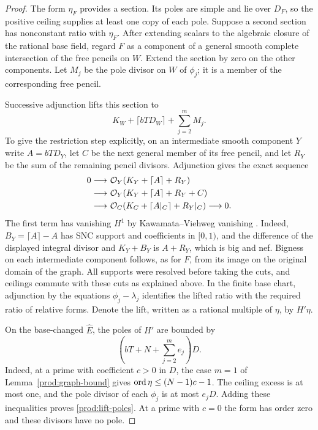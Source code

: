 \begin{proof}
The form $\eta_F$ provides a section.  Its poles are simple and lie
over $D_F$, so the positive ceiling supplies at least one copy of each
pole.  Suppose a second section has nonconstant ratio with $\eta_F$.
After extending scalars to the algebraic closure of the rational base
field, regard $F$ as a component of a general smooth complete
intersection of the free pencils on $W$.  Extend the section by zero
on the other components.  Let $M_j$ be the pole divisor on $W$ of
$\phi_j$; it is a member of the corresponding free pencil.

Successive adjunction lifts this section to
\[
 K_W+\lceil bTD_W\rceil+\sum_{j=2}^m M_j.
\]
To give the restriction step explicitly, on an intermediate smooth
component $Y$ write $A=bTD_Y$, let $C$ be the next general member of
its free pencil, and let $R_Y$ be the sum of the remaining pencil
divisors.  Adjunction gives the exact sequence
\[
\begin{split}
0\longrightarrow&\ \mathcal O_Y(K_Y+\lceil A\rceil+R_Y)\\
\longrightarrow&\ \mathcal O_Y(K_Y+\lceil A\rceil+R_Y+C)\\
\longrightarrow&\ \mathcal O_C(K_C+\lceil A|_C\rceil+R_Y|_C)
\longrightarrow0.
\end{split}
\]
The first term has vanishing $H^1$ by Kawamata--Viehweg vanishing
\cite[Section~3.1]{FujinoFundamental}.  Indeed,
$B_Y=\lceil A\rceil-A$ has SNC support and coefficients in $[0,1)$,
and the difference of the displayed integral divisor and $K_Y+B_Y$
is $A+R_Y$, which is big and nef.  Bigness on each intermediate
component follows, as for $F$, from its image on the original domain
of the graph.  All supports were resolved before taking the cuts, and
ceilings commute with these cuts as explained above.  In the finite
base chart, adjunction by the
equations $\phi_j-\lambda_j$ identifies the lifted ratio with the
required ratio of relative forms.  Denote the lift, written as a
rational multiple of $\eta$, by $H'\eta$.

On the base-changed $\widehat E$, the poles of $H'$ are bounded by
\begin{equation}\label{prod:lift-poles}
 \left(bT+N+\sum_{j=2}^m e_j\right)D.
\end{equation}
Indeed, at a prime with coefficient $c>0$ in $D$, the case $m=1$ of
Lemma~\ref{prod:graph-bound} gives
$\operatorname{ord}\eta\leq(N-1)c-1$.  The ceiling excess is at most one, and the
pole divisor of each $\phi_j$ is at most $e_jD$.  Adding these
inequalities proves \eqref{prod:lift-poles}.  At a prime with $c=0$ the
form has order zero and these divisors have no pole.


\end{proof}
